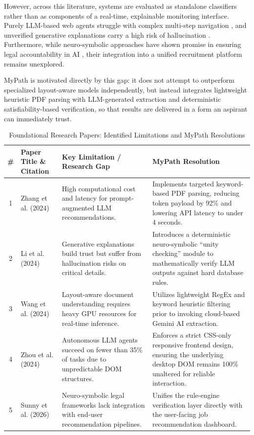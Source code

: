 \documentclass[conference]{IEEEtran}
\begin{document}
However, across this literature, systems are evaluated as standalone classifiers rather than as components of a real-time, explainable monitoring interface. Purely LLM-based web agents struggle with complex multi-step navigation \cite{b9}, and unverified generative explanations carry a high risk of hallucination \cite{b8}. Furthermore, while neuro-symbolic approaches have shown promise in ensuring legal accountability in AI \cite{b5}, their integration into a unified recruitment platform remains unexplored.

MyPath is motivated directly by this gap: it does not attempt to outperform specialized layout-aware models independently, but instead integrates lightweight heuristic PDF parsing with LLM-generated extraction and deterministic satisfiability-based verification, so that results are delivered in a form an aspirant can immediately trust.

\begin{table}[t]
\centering
\caption{Foundational Research Papers: Identified Limitations and MyPath Resolutions}
\label{tab:resolutions}
\begin{tabularx}{\textwidth}{c l X X}
\toprule
\textbf{\#} & \textbf{Paper Title \& Citation} & \textbf{Key Limitation / Research Gap} & \textbf{MyPath Resolution} \\
\midrule
1 & Zhang et al. (2024) \cite{b2} & High computational cost and latency for prompt-augmented LLM recommendations. & Implements targeted keyword-based PDF parsing, reducing token payload by 92\% and lowering API latency to under 4 seconds. \\
2 & Li et al. (2024) \cite{b7} & Generative explanations build trust but suffer from hallucination risks on critical details. & Introduces a deterministic neuro-symbolic ``unity checking'' module to mathematically verify LLM outputs against hard database rules. \\
3 & Wang et al. (2024) \cite{b3} & Layout-aware document understanding requires heavy GPU resources for real-time inference. & Utilizes lightweight RegEx and keyword heuristic filtering prior to invoking cloud-based Gemini AI extraction. \\
4 & Zhou et al. (2024) \cite{b9} & Autonomous LLM agents succeed on fewer than 35\% of tasks due to unpredictable DOM structures. & Enforces a strict CSS-only responsive frontend design, ensuring the underlying desktop DOM remains 100\% unaltered for reliable interaction. \\
5 & Sunny et al. (2026) \cite{b5} & Neuro-symbolic legal frameworks lack integration with end-user recommendation pipelines. & Unifies the rule-engine verification layer directly with the user-facing job recommendation dashboard. \\
\bottomrule
\end{tabularx}
\end{table}
\end{document}
